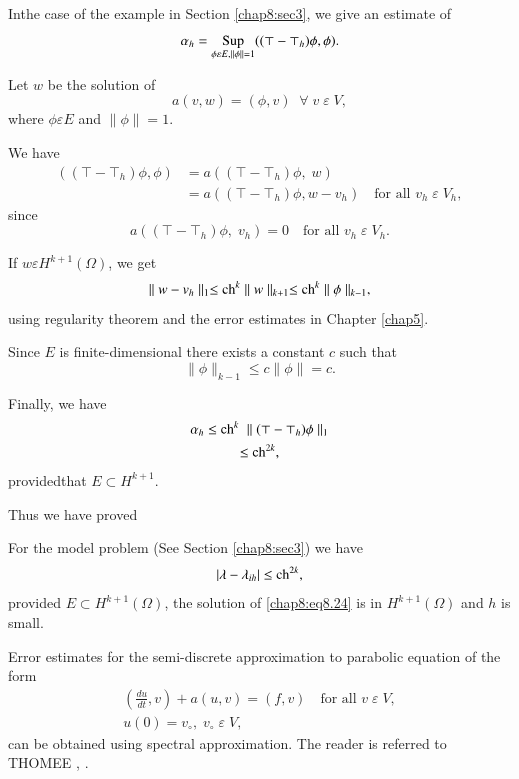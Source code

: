 \medskip
{}
 In\pageoriginale the case of the
example in Section \ref{chap8:sec3}, we give an estimate of 
$$
\alpha_h=\underset{\phi\varepsilon E,\parallel\phi\parallel=1} {\operatorname{Sup}}
((\top-\top_h)\phi,\phi).
$$

Let $w$ be the solution of 
\begin{equation}\label{chap8:eq8.24}
a(v,w)=(\phi,v)\; \; \forall \;v \;\varepsilon \;V,
\end{equation}
where $\phi\varepsilon E$ and $\parallel\phi\parallel=1$.

\noindent We have 
\begin{align*}
((\top-\top_h)\phi,\phi) &= a((\top-\top_h)\phi,\;w)\\
&= a((\top-\top_h)\phi,w-v_h)\quad\text{for all } v_h
\;\varepsilon \;V_h,
\end{align*}
since
$$
a((\top-\top_h)\phi,\;v_h)=0\quad\text{for all } v_h \;\varepsilon
\;V_h.
$$

If $w\varepsilon H^{k+1}(\Omega)$, we get
$$
\parallel w-v_h\parallel_1\leq\operatorname{ch}^k\parallel w\parallel_{k+1} \leq
\operatorname{ch}^k\parallel\phi\parallel_{k-1},
$$
using regularity theorem and the error estimates in Chapter
\ref{chap5}.

Since $E$ is finite-dimensional there exists a constant $c$ such that 
$$
\parallel\phi\parallel_{k-1}\leq c\parallel\phi\parallel =c.
$$

Finally, we have 
\begin{gather*}
\alpha_h\leq\operatorname{ch}^k\;\parallel(\top-\top_h)\phi\parallel_1\\
\leq\operatorname{ch}^{2k},
\end{gather*}
provided\pageoriginale that $E\subset H^{k+1}$.

Thus we have proved

\begin{THM}\label{chap8:THM6}
For the model problem (See Section \ref{chap8:sec3}) we have 
$$
|\lambda-\lambda_{ih}|\leq\operatorname{ch}^{2k},
$$
provided $E\subset H^{k+1}(\Omega)$, the solution of
\eqref{chap8:eq8.24} is in $H^{k+1}(\Omega)$ and $h$ is small.
\end{THM}

\setcounter{REM}{1}
\begin{REM}\label{chap8:rem2}
Error estimates for the semi-discrete approximation to parabolic
equation of the form
\begin{gather*}
\left(\frac{du}{dt},v\right)+a(u,v)=(f,v)\quad\text{for all } v
\;\varepsilon \;V,\\
u(0)=v_\circ,\;v_\circ \;\varepsilon \;V,
\end{gather*}
can be obtained using spectral approximation. The reader is referred
to THOMEE \cite{key44}, \cite{key45}.
\end{REM}
